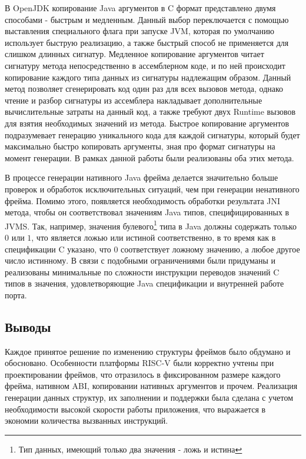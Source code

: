 В OpenJDK копирование Java аргументов в C формат представлено двумя способами - быстрым и медленным. Данный выбор переключается с помощью выставления специального флага при запуске JVM, которая по умолчанию использует быструю реализацию, а также быстрый способ не применяется для слишком длинных сигнатур. Медленное копирование аргументов читает сигнатуру метода непосредственно в ассемблерном коде, и по ней происходит копирование каждого типа данных из сигнатуры надлежащим образом. Данный метод позволяет сгенерировать код один раз для всех вызовов метода, однако чтение и разбор сигнатуры из ассемблера накладывает дополнительные вычислительные затраты на данный код, а также требуют двух Runtime вызовов для взятия необходимых значений из метода. Быстрое копирование аргументов подразумевает генерацию уникального кода для каждой сигнатуры, который будет максимально быстро копировать аргументы, зная про формат сигнатуры на момент генерации. В рамках данной работы были реализованы оба этих метода.

В процессе генерации нативного Java фрейма делается значительно больше проверок и обработок исключительных ситуаций, чем при генерации ненативного фрейма. Помимо этого, появляется необходимость обработки результата JNI метода, чтобы он соответствовал значениям Java типов, специфицированных в JVMS. Так, например, значения булевого\footnote{Тип данных, имеющий только два значения - ложь и истина} типа в Java должны содержать только $0$ или $1$, что является ложью или истиной соответственно, в то время как в спецификации C указано, что $0$ соответствует ложному значению, а любое другое число истинному. В связи с подобными ограничениями были придуманы и реализованы минимальные по сложности инструкции переводов значений C типов в значения, удовлетворяющие Java спецификации и внутренней работе порта.


\subsection{Выводы}

Каждое принятое решение по изменению структуры фреймов было обдумано и обосновано. Особенности платформы RISC-V были корректно учтены при проектировании фреймов, что отразилось в фиксированном размере каждого фрейма, нативном ABI, копировании нативных аргументов и прочем. Реализация генерации данных структур, их заполнении и поддержки была сделана с учетом необходимости высокой скорости работы приложения, что выражается в экономии количества вызванных инструкций.
